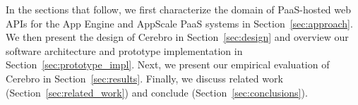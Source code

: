 
In the sections that follow, we first characterize the domain of 
PaaS-hosted web APIs for the App Engine and AppScale PaaS systems 
in Section~\ref{sec:approach}.   
We then present the design of Cerebro in Section~\ref{sec:design}
and overview our software architecture and prototype implementation
in Section~\ref{sec:prototype_impl}.
Next, we
present our empirical evaluation of Cerebro in 
Section~\ref{sec:results}.
Finally,  we discuss related work (Section~\ref{sec:related_work}) and 
conclude (Section~\ref{sec:conclusions}).
